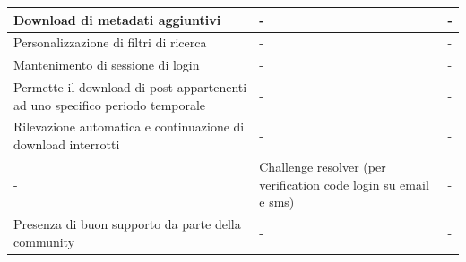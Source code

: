 \clearpage
\begin{table}[!htb]
\begin{tabular}{|p{}|p{}|p{}|}
\hline
Download di metadati aggiuntivi & - & -\\\hline
Personalizzazione di filtri di ricerca & - & - \\\hline
Mantenimento di sessione di login & - & - \\\hline
Permette il download di post appartenenti ad uno specifico periodo temporale & - & -\\\hline
Rilevazione automatica e continuazione di download interrotti & - & - \\\hline
- & Challenge resolver (per verification code login su email e sms) & - \\\hline
Presenza di buon supporto da parte della community & - & - \\\hline
\end{tabular}

\end{table}


